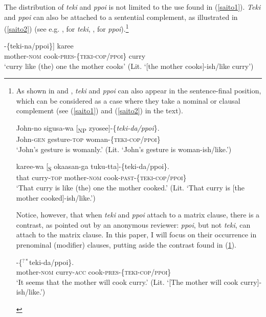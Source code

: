 \documentclass[output=paper]{langscibook}
\begin{document}
The distribution of \emph{teki} and  \emph{ppoi} is not limited to the use found in (\ref{saito1}).  \emph{Teki} and  \emph{ppoi} can also be attached to a sentential complement, as illustrated in (\ref{saito2}) (see e.g. \citealt{Yamashita2000}, \citealt{Saito2017} for \emph{teki},  \citealt{Kojima2003}, \citealt{Yamada2014} for  \emph{ppoi}).\footnote{As shown in  and , \textit{teki} and \textit{ppoi} can also appear in the sentence-final position, which can be considered as a case where they take a nominal or clausal complement (see (\ref{saito1}) and (\ref{saito2}) in the text). 

\begin{exe}
\ex \label{saitoi}
\gll John-no sigusa-wa [\textsubscript{NP} zyosee]-\{\emph{teki-da/ppoi}\}.\\
John-\textsc{gen} gesture-\textsc{top} {} woman-\{\textsc{teki-cop/ppoi}\}\\ 
\glt `John’s gesture is womanly.' (Lit. ‘John’s gesture is woman-ish/like.’)

\ex \label{saitoii}
 {karee-wa} [\textsubscript{S} {okaasan-ga} {tuku-tta}]-\{{teki-da/ppoi}\}.\\
that curry-\textsc{top} {} mother-\textsc{nom} cook-\textsc{past}-\{\textsc{teki-cop/ppoi}\}\\ 
\glt ‘That curry is like (the) one the mother cooked.’ (Lit. ‘That curry is [the mother cooked]-ish/like.’)

\end{exe}

Notice, however, that when \emph{teki} and \emph{ppoi} attach to a matrix clause, there is a contrast, as pointed out by an anonymous reviewer: \emph{ppoi}, but not \emph{teki}, can attach to the matrix clause. In this paper, I will focus on their occurrence in prenominal (modifier) clauses, putting aside the contrast found in (\ref{saitoiii}).
\begin{exe}
\ex \label{saitoiii}
-\{$^{?*}${teki-da/ppoi}\}.\\
mother-\textsc{nom} curry-\textsc{acc} cook-\textsc{pres}-\{\textsc{teki-cop/ppoi}\}\\ 
\glt ‘It seems that the mother will cook curry.’ (Lit. ‘[The mother will cook curry]-ish/like.’)
\end{exe}
}

\begin{exe}
\ex \label{saito2}
\gll [[\textsubscript{S} {okaasan-ga}   {tuku-ru}]-\{{teki-na/ppoi}\}] {karee}\\
{} mother-\textsc{nom} cook-\textsc{pres}-\{\textsc{teki-cop/ppoi}\} curry\\ 
\glt ‘curry like (the) one the mother cooks’ (Lit. ‘[the mother cooks]-ish/like curry’)
\end{exe}
\end{document}

